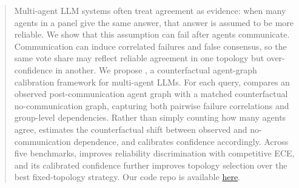 \begin{abstract}
Multi-agent LLM systems often treat agreement as evidence: when many agents in a panel give the same answer, that answer is assumed to be more reliable. 
We show that this assumption can fail after agents communicate. 
Communication can induce correlated failures and false consensus, so the same vote share may reflect reliable agreement in one topology but over-confidence in another.
We propose \methodname{}, 
a counterfactual agent-graph calibration framework for multi-agent LLMs. 
For each query, \methodname{} compares an observed post-communication agent graph with a matched counterfactual no-communication graph, capturing both pairwise failure correlations and group-level dependencies.
Rather than simply counting how many agents agree, \methodname{} estimates the counterfactual shift between observed and no-communication dependence, and calibrates confidence accordingly.
Across five benchmarks, \methodname{} improves reliability discrimination with competitive ECE, and its calibrated confidence further improves topology selection over the best fixed-topology strategy. Our code repo is available \href{https://anonymous.4open.science/r/Counterfactual-Graph-Calibration-for-Multi-Agent-LLMs-FDB0}{here}.
\end{abstract}



